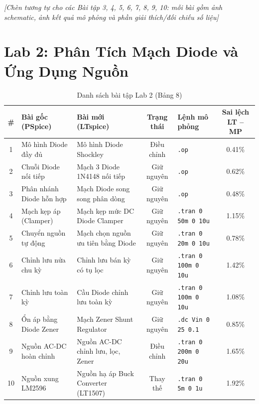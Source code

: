 \documentclass[12pt,a4paper]{report}
\begin{document}
\begin{orangebox}
\textit{\color{guidegray}[Chèn tương tự cho các Bài tập 3, 4, 5, 6, 7, 8, 9, 10: mỗi bài gồm ảnh schematic, ảnh kết quả mô phỏng và phần giải thích/đối chiếu số liệu]}
\end{orangebox}

\section{Lab 2: Phân Tích Mạch Diode và Ứng Dụng Nguồn}

\begin{table}[H]
\centering
\caption{Danh sách bài tập Lab 2 (Bảng 8)}
\label{tab:bang8_lab2}
\renewcommand{\arraystretch}{1.2}
\small
\begin{tabularx}{\textwidth}{|c|p{4.0cm}|p{4.0cm}|c|l|c|}
\hline
\rowcolor{codebg}
\textbf{\#} & \textbf{Bài gốc (PSpice)} & \textbf{Bài mới (LTspice)} & \textbf{Trạng thái} & \textbf{Lệnh mô phỏng} & \textbf{Sai lệch LT -- MP} \\ \hline
1 & Mô hình Diode đầy đủ & Mô hình Diode Shockley & Điều chỉnh & \lstinline|.op| & 0.41\% \\ \hline
2 & Chuỗi Diode nối tiếp & Mạch 3 Diode 1N4148 nối tiếp & Giữ nguyên & \lstinline|.op| & 0.62\% \\ \hline
3 & Phân nhánh Diode hỗn hợp & Mạch Diode song song phân dòng & Giữ nguyên & \lstinline|.op| & 0.48\% \\ \hline
4 & Mạch kẹp áp (Clamper) & Mạch kẹp mức DC Diode Clamper & Giữ nguyên & \lstinline|.tran 0 50m 0 10u| & 1.15\% \\ \hline
5 & Chuyển nguồn tự động & Mạch chọn nguồn ưu tiên bằng Diode & Giữ nguyên & \lstinline|.tran 0 20m 0 10u| & 0.78\% \\ \hline
6 & Chỉnh lưu nửa chu kỳ & Chỉnh lưu bán kỳ có tụ lọc & Giữ nguyên & \lstinline|.tran 0 100m 0 10u| & 1.42\% \\ \hline
7 & Chỉnh lưu toàn kỳ & Cầu Diode chỉnh lưu toàn kỳ & Giữ nguyên & \lstinline|.tran 0 100m 0 10u| & 1.08\% \\ \hline
8 & Ổn áp bằng Diode Zener & Mạch Zener Shunt Regulator & Giữ nguyên & \lstinline|.dc Vin 0 25 0.1| & 0.85\% \\ \hline
9 & Nguồn AC-DC hoàn chỉnh & Nguồn AC-DC chỉnh lưu, lọc, Zener & Điều chỉnh & \lstinline|.tran 0 200m 0 20u| & 1.65\% \\ \hline
10 & Nguồn xung LM2596 & Nguồn hạ áp Buck Converter (LT1507) & Thay thế & \lstinline|.tran 0 5m 0 1u| & 1.92\% \\ \hline
\end{tabularx}
\end{table}
\end{document}
